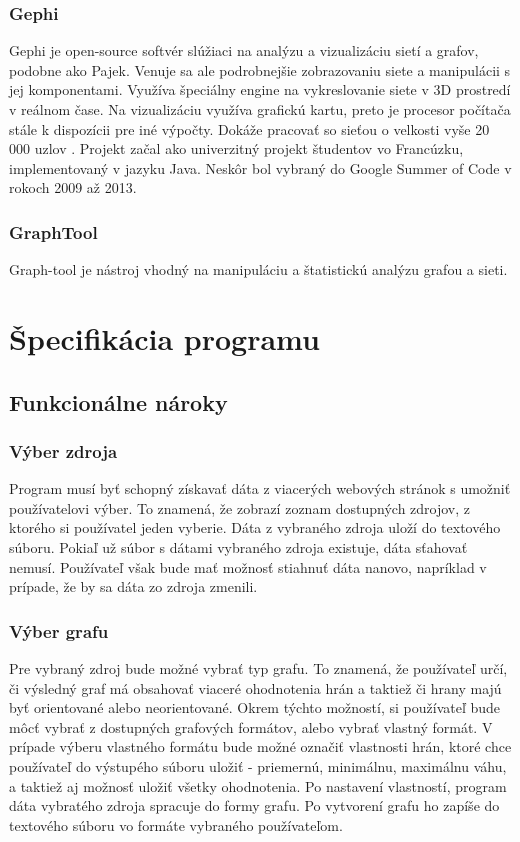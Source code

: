 \documentclass[12pt,twoside,slovak,a4paper]{article}
\begin{document}
	\subsubsection{Gephi}
	Gephi je open-source softvér slúžiaci na analýzu a vizualizáciu sietí a grafov, podobne ako Pajek. Venuje sa ale podrobnejšie zobrazovaniu siete a manipulácii s jej komponentami. Využíva špeciálny engine na vykreslovanie siete v 3D prostredí v reálnom čase. Na vizualizáciu využíva grafickú kartu, preto je procesor počítača stále k dispozícii pre iné výpočty. Dokáže pracovať so sieťou o velkosti vyše 20 000 uzlov \cite{GEPHI}.   
	Projekt začal ako univerzitný projekt študentov vo Francúzku, implementovaný v jazyku Java. Neskôr bol vybraný do Google Summer of Code v rokoch 2009 až 2013.
	
	\subsubsection{GraphTool}
Graph-tool je nástroj vhodný na manipuláciu	a štatistickú analýzu grafou a sieti.
	
\section{Špecifikácia programu}

\subsection{Funkcionálne nároky}
\subsubsection{Výber zdroja}
Program musí byť schopný získavať dáta z viacerých webových stránok s umožniť používatelovi výber. To znamená, že zobrazí zoznam dostupných zdrojov, z ktorého si používatel jeden vyberie. Dáta z vybraného zdroja uloží do textového súboru. Pokiaľ už súbor s dátami vybraného zdroja existuje, dáta sťahovať nemusí. Používateľ však bude mať možnosť stiahnuť dáta nanovo, napríklad v prípade, že by sa dáta zo zdroja zmenili.
\subsubsection{Výber grafu}
Pre vybraný zdroj bude možné vybrať typ grafu. To znamená, že používateľ určí, či výsledný graf má obsahovať viaceré ohodnotenia hrán a taktiež či hrany majú byť orientované alebo neorientované. Okrem týchto možností, si používateľ bude môcť vybrať z dostupných grafových formátov, alebo vybrať vlastný formát. V prípade výberu vlastného formátu bude možné označiť vlastnosti hrán, ktoré chce používateľ do výstupého súboru uložiť - priemernú, minimálnu, maximálnu váhu, a taktiež aj možnosť uložiť všetky ohodnotenia. Po nastavení vlastností, program dáta vybratého zdroja spracuje do formy grafu. Po vytvorení grafu ho zapíše do textového súboru vo formáte vybraného používateľom. 
\end{document}
